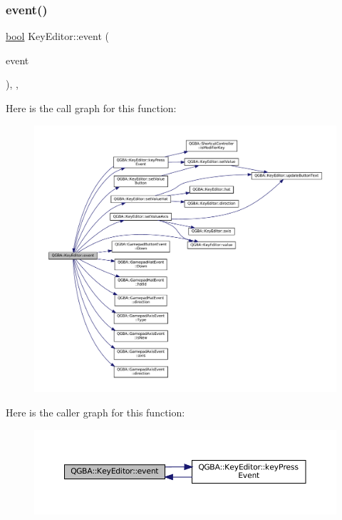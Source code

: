 \subsubsection{\texorpdfstring{event()}{event()}}
{\footnotesize\ttfamily \mbox{\hyperlink{libretro_8h_a4a26dcae73fb7e1528214a068aca317e}{bool}} Key\+Editor\+::event (\begin{DoxyParamCaption}\item[{Q\+Event $\ast$}]{event }\end{DoxyParamCaption})\hspace{0.3cm}{\ttfamily [override]}, {\ttfamily [protected]}, {\ttfamily [virtual]}}

Here is the call graph for this function\+:
\nopagebreak
\begin{figure}[H]
\begin{center}
\leavevmode
\includegraphics[width=350pt]{class_q_g_b_a_1_1_key_editor_ac685742decd6c4140c00110fb1abaca5_cgraph}
\end{center}
\end{figure}
Here is the caller graph for this function\+:
\nopagebreak
\begin{figure}[H]
\begin{center}
\leavevmode
\includegraphics[width=350pt]{class_q_g_b_a_1_1_key_editor_ac685742decd6c4140c00110fb1abaca5_icgraph}
\end{center}
\end{figure}
\mbox{\label{class_q_g_b_a_1_1_key_editor_a13aee5f3cf3a557a96334eda9b44b6d0}} 
